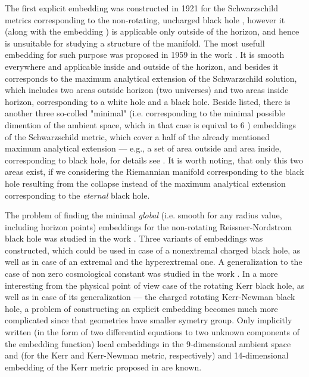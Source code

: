 \documentclass[12pt]{article}
\begin{document}
The first explicit embedding was constructed in 1921 for the Schwarzschild metrics corresponding to the non-rotating, uncharged black hole \cite{kasner3},
however it (along with the embedding \cite{fudjitani}) is applicable only outside of the horizon, and hence is unsuitable for  studying a structure of the manifold.
The most usefull embedding for such purpose was proposed in 1959 in the work \cite{frons}. It is smooth everywhere
and applicable inside and outside of the horizon, and besides it corresponds to the maximum analytical extension of the Schwarzschild solution,
which includes two areas outside horizon (two universes) and two areas inside horizon, corresponding to a white hole and a black hole.
Beside listed, there is another three so-colled "minimal"{} (i.e. corresponding to the minimal possible dimention
of the ambient space, which in that case is equival to 6 \cite{kasner2}) embeddings \cite{davidson,statja27} of the Schwarzschild metric, which cover a half of the already mentioned maximum analytical extension --- e.g., a set of area outside and area inside, corresponding to black hole,
for details see \cite{statja27}.
It is worth noting, that only this two areas exist, if we considering the Riemannian manifold corresponding to the black hole resulting from the collapse instead of the maximum analytical extension corresponding to the \emph{eternal} black hole.

The problem of finding the minimal \emph{global} (i.e. smooth for any radius value, including horizon points)
embeddings for the non-rotating Reissner-Nordstrom black hole was studied in the work \cite{statja30}.
Three variants of embeddings  was constructed, which could be used in case of a nonextremal charged black hole,
as well as in case of an extremal and the hyperextremal one. A generalization to the case of non zero cosmological constant was studied in the work \cite{statja40}.
In a more interesting from the physical point of view case of the rotating Kerr black hole, as well as in case of its generalization --- the charged rotating Kerr-Newman black hole,
a problem of constructing an explicit embedding becomes much more complicated since that geometries have smaller symetry group.
Only implicitly written (in the form of two differential equations to two unknown components of the embedding function) local embeddings in the 9-dimensional ambient space \cite{kuzeev} and \cite{kuzeevRN} (for the Kerr and Kerr-Newman metric, respectively) and 14-dimensional embedding of the Kerr metric proposed in \cite{gr-qc/0503079} are known.
\end{document}
